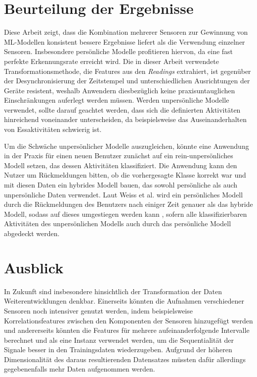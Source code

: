 \section{Beurteilung der Ergebnisse}
Diese Arbeit zeigt, dass die Kombination mehrerer Sensoren zur Gewinnung von ML-Modellen konsistent bessere Ergebnisse liefert als die Verwendung einzelner Sensoren. Insbesondere persönliche Modelle profitieren hiervon, da eine fast perfekte Erkennungsrate erreicht wird. Die in dieser Arbeit verwendete Transformationsmethode, die Features aus den \textit{Readings} extrahiert, ist gegenüber der Desynchronisierung der Zeitstempel und unterschiedlichen Ausrichtungen der Geräte resistent, weshalb Anwendern diesbezüglich keine praxisuntauglichen Einschränkungen auferlegt werden müssen. Werden unpersönliche Modelle verwendet, sollte darauf geachtet werden, dass sich die definierten Aktivitäten hinreichend voneinander unterscheiden, da beispielsweise das Auseinanderhalten von Essaktivitäten schwierig ist.

Um die Schwäche unpersönlicher Modelle auszugleichen, könnte eine Anwendung in der Praxis für einen neuen Benutzer zunächst auf ein rein-unpersönliches Modell setzen, das dessen Aktivitäten klassifiziert. Die Anwendung kann den Nutzer um Rückmeldungen bitten, ob die vorhergesagte Klasse korrekt war und mit diesen Daten ein hybrides Modell bauen, das sowohl persönliche als auch unpersönliche Daten verwendet. Laut Weiss et al. wird ein persönliches Modell durch die Rückmeldungen des Benutzers nach einiger Zeit genauer als das hybride Modell, sodass auf dieses umgestiegen werden kann \cite{Weiss2012}, sofern alle klassifizierbaren Aktivitäten des unpersönlichen Modells auch durch das persönliche Modell abgedeckt werden.

\section{Ausblick}
In Zukunft sind insbesondere hinsichtlich der Transformation der Daten Weiterentwicklungen denkbar. Einerseits könnten die Aufnahmen verschiedener Sensoren noch intensiver genutzt werden, indem beispielsweise Korrelationsfeatures zwischen den Komponenten der Sensoren hinzugefügt werden und andererseits könnten die Features für mehrere aufeinanderfolgende Intervalle berechnet und als eine Instanz verwendet werden, um die Sequentialität der Signale besser in den Trainingsdaten wiederzugeben. Aufgrund der höheren Dimensionalität des daraus resultierenden Datensatzes müssten dafür allerdings gegebenenfalls mehr Daten aufgenommen werden.

